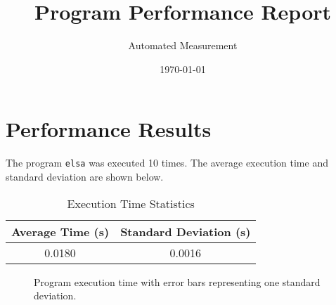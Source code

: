 \documentclass{article}
\title{Program Performance Report}
\author{Automated Measurement}
\date{\today}
\begin{document}
\maketitle

\section{Performance Results}

The program \texttt{elsa} was executed 10 times. The average execution time and standard deviation are shown below.

\begin{table}[h]
\centering
\begin{tabular}{cc}
\toprule
Average Time (s) & Standard Deviation (s) \\
\midrule
0.0180 & 0.0016 \\
\bottomrule
\end{tabular}
\caption{Execution Time Statistics}
\end{table}

\begin{figure}[h]
\centering

\caption{Program execution time with error bars representing one standard deviation.}
\end{figure}
\end{document}
